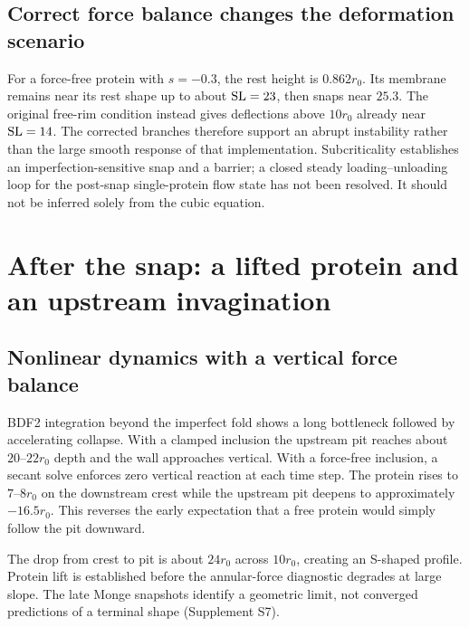 \subsection{Correct force balance changes the deformation scenario}
For a force-free protein with $s=-0.3$, the rest height is $0.862r_0$. Its membrane remains near its rest shape up to about $\mathrm{SL}=23$, then snaps near $25.3$. The original free-rim condition instead gives deflections above $10r_0$ already near $\mathrm{SL}=14$. The corrected branches therefore support an abrupt instability rather than the large smooth response of that implementation. Subcriticality establishes an imperfection-sensitive snap and a barrier; a closed steady loading--unloading loop for the post-snap single-protein flow state has not been resolved. It should not be inferred solely from the cubic equation.

\clearpage
\section{After the snap: a lifted protein and an upstream invagination}
\subsection{Nonlinear dynamics with a vertical force balance}
BDF2 integration beyond the imperfect fold shows a long bottleneck followed by accelerating collapse. With a clamped inclusion the upstream pit reaches about $20$--$22r_0$ depth and the wall approaches vertical. With a force-free inclusion, a secant solve enforces zero vertical reaction at each time step. The protein rises to $7$--$8r_0$ on the downstream crest while the upstream pit deepens to approximately $-16.5r_0$. This reverses the early expectation that a free protein would simply follow the pit downward.

The drop from crest to pit is about $24r_0$ across $10r_0$, creating an S-shaped profile. Protein lift is established before the annular-force diagnostic degrades at large slope. The late Monge snapshots identify a geometric limit, not converged predictions of a terminal shape (Supplement S7).


